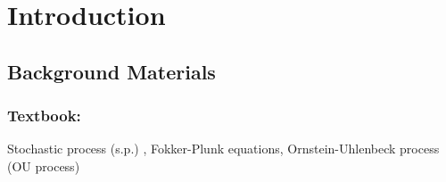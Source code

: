 

\section{Introduction}


\subsection{Background Materials}

\subsubsection{Textbook: \autocite{pavliotis_stochastic_2016}}
Stochastic process (s.p.) , Fokker-Plunk equations, Ornstein-Uhlenbeck process (OU process)

